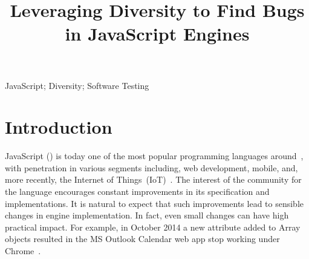 \documentclass[10pt,conference,anonymous]{IEEEtran}
\begin{document}
\title{Leveraging Diversity to Find Bugs\\ in JavaScript Engines}


\maketitle

\thispagestyle{plain}
\pagestyle{plain}

\begin{abstract}
  
\end{abstract}

\begin{IEEEkeywords}
JavaScript; Diversity; Software Testing
\end{IEEEkeywords}

\section{Introduction}

JavaScript (\js{}) is today one of the most popular programming
languages around~\cite{business-insider,stackify}, with penetration in
various segments including, web development, mobile, and, more
recently, the Internet of Things~(IoT)~\cite{simply-technologies}. The
interest of the community for the language encourages constant
improvements in its specification and implementations. It is natural
to expect that such improvements lead to sensible changes in engine
implementation. In fact, even small changes can have high practical impact. For
example, in October 2014 a new attribute added to Array objects
resulted in the MS Outlook Calendar web app stop working under
Chrome~\cite{array-bug-chromium-issue4247,array-bug-discussion}.
\end{document}
